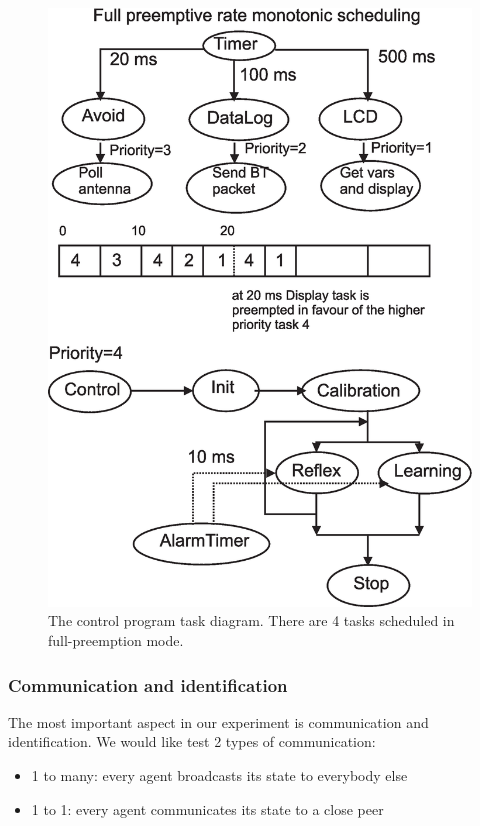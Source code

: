 \begin{figure}[htbp]
\begin{center}
\includegraphics[scale=0.4]{figures/nxtosek/TaskLejos.eps}
\caption[Controller task allocation]{The control program task diagram.
There are 4 tasks scheduled in full-preemption mode. \label{nxtOsek:task}}
\end{center}
\end{figure}
\subsubsection{Communication and identification}
The most important aspect in our experiment is communication and identification.
We would like test 2 types of communication:
\begin{itemize}
 \item 1 to many: every agent broadcasts its state to everybody else
 \item 1 to 1: every agent communicates its state to a close peer
\end{itemize}

